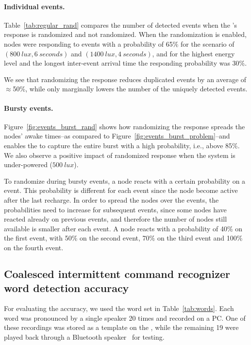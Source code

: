 \paragraph{Individual events.} 
Table~\ref{tab:regular_rand} compares the number of detected events when the \cim's response is randomized and not randomized.
When the randomization is enabled, nodes were responding to events with a probability of 65\% for the scenario of $\left(\SI{800}{lux}, \SI{6}{seconds}\right)$ and $\left(\SI{1400}{lux}, \SI{4}{seconds}\right)$, and for the highest energy level and the longest inter-event arrival time the responding probability was 30\%.

We see that randomizing the response reduces duplicated events by an average of $\approx$50\%, while only marginally lowers the number of the uniquely detected events. 

\paragraph{Bursty events.}
Figure~\ref{fig:events_burst_rand} shows how randomizing the \sys response spreads the nodes' awake times--as compared to Figure~\ref{fig:events_burst_problem}--and enables the \sys to capture the entire burst with a high probability, i.e., above 85\%. We also observe a positive impact of randomized response when the system is under-powered ($\SI{500}{lux}$).

To randomize during bursty events, a node reacts with a certain probability on a event. This probability is different for each event since the node become active after the last recharge. In order to spread the nodes over the events, the probabilities need to increase for subsequent events, since some nodes have reacted already on previous events, and therefore the number of nodes still available is smaller after each event.
A node reacts with a probability of 40\% on the first event, with 50\% on the second event, 70\% on the third event and 100\% on the fourth event.


\subsection{Coalesced intermittent command recognizer word detection accuracy}
For evaluating the \fullcim accuracy, we used the word set in Table~\ref{tab:words}.
Each word was pronounced by a single speaker 20 times and recorded on a PC. One of these recordings was stored as a template on the \cim, while the remaining 19 were played back through a Bluetooth speaker~\cite{microphone} for testing.

